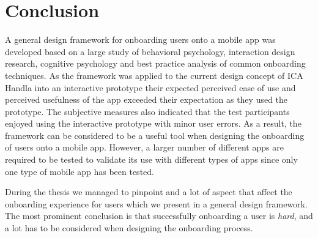 \chapter{Conclusion}
\label{chap:conclusion}

A general design framework for onboarding users onto a mobile app was developed based on a large study of behavioral psychology, interaction design research, cognitive psychology and best practice analysis of common onboarding techniques. As the framework was applied to the current design concept of ICA Handla into an interactive prototype their expected perceived ease of use and perceived usefulness of the app exceeded their expectation as they used the prototype. The subjective measures also indicated that the test participants enjoyed using the interactive prototype with minor user errors. As a result, the framework can be considered to be a useful tool when designing the onboarding of users onto a mobile app. However, a larger number of different apps are required to be tested to validate its use with different types of apps since only one type of mobile app has been tested.

During the thesis we managed to pinpoint and a lot of aspect that affect the onboarding experience for users which we present in a general design framework. The most prominent conclusion is that successfully onboarding a user is \textit{hard}, and a lot has to be considered when designing the onboarding process.



